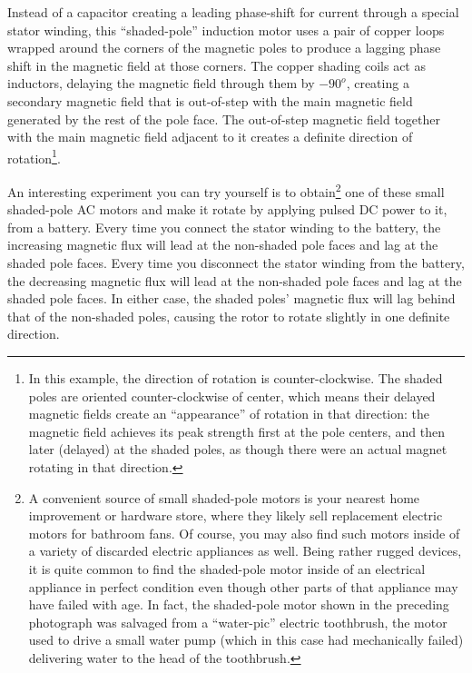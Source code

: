 Instead of a capacitor creating a leading phase-shift for current through a special stator winding, this ``shaded-pole'' induction motor uses a pair of copper loops wrapped around the corners of the magnetic poles to produce a lagging phase shift in the magnetic field at those corners.  The copper shading coils act as inductors, delaying the magnetic field through them by $-90^{o}$, creating a secondary magnetic field that is out-of-step with the main magnetic field generated by the rest of the pole face.  The out-of-step magnetic field together with the main magnetic field adjacent to it creates a definite direction of rotation\footnote{In this example, the direction of rotation is counter-clockwise.  The shaded poles are oriented counter-clockwise of center, which means their delayed magnetic fields create an ``appearance'' of rotation in that direction: the magnetic field achieves its peak strength first at the pole centers, and then later (delayed) at the shaded poles, as though there were an actual magnet rotating in that direction.}.  

An interesting experiment you can try yourself is to obtain\footnote{A convenient source of small shaded-pole motors is your nearest home improvement or hardware store, where they likely sell replacement electric motors for bathroom fans.  Of course, you may also find such motors inside of a variety of discarded electric appliances as well.  Being rather rugged devices, it is quite common to find the shaded-pole motor inside of an electrical appliance in perfect condition even though other parts of that appliance may have failed with age.  In fact, the shaded-pole motor shown in the preceding photograph was salvaged from a ``water-pic'' electric toothbrush, the motor used to drive a small water pump (which in this case had mechanically failed) delivering water to the head of the toothbrush.} one of these small shaded-pole AC motors and make it rotate by applying pulsed DC power to it, from a battery.  Every time you connect the stator winding to the battery, the increasing magnetic flux will lead at the non-shaded pole faces and lag at the shaded pole faces.  Every time you disconnect the stator winding from the battery, the decreasing magnetic flux will lead at the non-shaded pole faces and lag at the shaded pole faces.  In either case, the shaded poles' magnetic flux will lag behind that of the non-shaded poles, causing the rotor to rotate slightly in one definite direction.

\vskip 10pt

